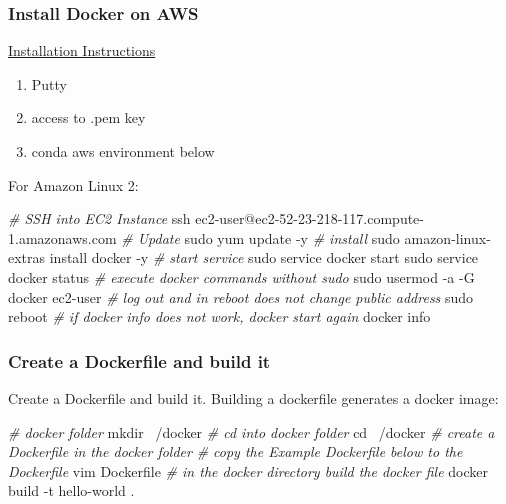 \documentclass[
]{book}
\newenvironment{Shaded}{\begin{snugshade}}{\end{snugshade}}
\newcommand{\BuiltInTok}[1]{#1}
\newcommand{\CommentTok}[1]{\textcolor[rgb]{0.56,0.35,0.01}{\textit{#1}}}
\newcommand{\ExtensionTok}[1]{#1}
\newcommand{\FunctionTok}[1]{\textcolor[rgb]{0.00,0.00,0.00}{#1}}
\newcommand{\NormalTok}[1]{#1}
\providecommand{\tightlist}{%
  \setlength{\itemsep}{0pt}\setlength{\parskip}{0pt}}
\begin{document}
\hypertarget{install-docker-on-aws}{%
\subsubsection{Install Docker on AWS}\label{install-docker-on-aws}}

\href{https://docs.aws.amazon.com/AmazonECS/latest/developerguide/docker-basics.html}{Installation Instructions}

\begin{enumerate}
\def\labelenumi{\arabic{enumi}.}
\tightlist
\item
  Putty
\item
  access to .pem key
\item
  conda aws environment below
\end{enumerate}

For Amazon Linux 2:

\begin{Shaded}
\begin{Highlighting}[]
\CommentTok{# SSH into EC2 Instance}
\FunctionTok{ssh}\NormalTok{ ec2-user@ec2-52-23-218-117.compute-1.amazonaws.com}
\CommentTok{# Update}
\FunctionTok{sudo}\NormalTok{ yum update -y}
\CommentTok{# install}
\FunctionTok{sudo}\NormalTok{ amazon-linux-extras install docker -y}
\CommentTok{# start service}
\FunctionTok{sudo}\NormalTok{ service docker start}
\FunctionTok{sudo}\NormalTok{ service docker status}
\CommentTok{# execute docker commands without sudo}
\FunctionTok{sudo}\NormalTok{ usermod -a -G docker ec2-user}
\CommentTok{# log out and in reboot does not change public address}
\FunctionTok{sudo}\NormalTok{ reboot}
\CommentTok{# if docker info does not work, docker start again}
\ExtensionTok{docker}\NormalTok{ info}
\end{Highlighting}
\end{Shaded}

\hypertarget{create-a-dockerfile-and-build-it}{%
\subsubsection{Create a Dockerfile and build it}\label{create-a-dockerfile-and-build-it}}

Create a Dockerfile and build it. Building a dockerfile generates a docker image:

\begin{Shaded}
\begin{Highlighting}[]
\CommentTok{# docker folder}
\FunctionTok{mkdir}\NormalTok{ ~/docker}
\CommentTok{# cd into docker folder}
\BuiltInTok{cd}\NormalTok{ ~/docker}
\CommentTok{# create a Dockerfile in the docker folder}
\CommentTok{# copy the Example Dockerfile below to the Dockerfile}
\ExtensionTok{vim}\NormalTok{ Dockerfile}
\CommentTok{# in the docker directory build the docker file}
\ExtensionTok{docker}\NormalTok{ build -t hello-world .}
\end{Highlighting}
\end{Shaded}
\end{document}
